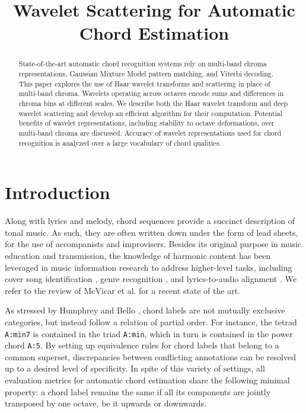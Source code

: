 \documentclass{article}
\title{Wavelet Scattering for Automatic Chord Estimation}
\makeatletter
\newcommand*{\etal}{et al.\@\xspace}
\makeatother
\begin{document}
%
\maketitle
%
\begin{abstract}
State-of-the-art automatic chord recognition systems rely on multi-band chroma representations,
Gaussian Mixture Model pattern matching, and Viterbi decoding.
This paper explores the use of Haar wavelet transforms and scattering in place of multi-band
chroma. Wavelets operating across octaves encode sums and differences in chroma bins at
different scales.
We describe both the Haar wavelet transform and deep wavelet scattering and develop an
efficient algorithm for their computation. Potential benefits of wavelet representations,
including stability to octave deformations, over multi-band chroma are discussed.
Accuracy of wavelet representations used for chord recognition is analyzed over a large
vocabulary of chord qualities.
\end{abstract}

\section{Introduction}\label{sec:introduction}
Along with lyrics and melody, chord sequences provide a succinct description of tonal music.
As such, they are often written down under the form of lead sheets, for the use of
accompanists and improvisers.
Besides its original purpose in music education and transmission, the knowledge of
harmonic content has been leveraged in music information research to address higher-level
tasks, including cover song identification \cite{ellis2007identifying},
genre recognition \cite{perez2009genre}, and lyrics-to-audio alignment
\cite{mauch2012integrating}. We refer to the review of McVicar \etal
\cite{mcvicar2014automatic} for a recent state of the art.

As stressed by Humphrey and Bello \cite{humphrey2015four}, chord labels
are not mutually exclusive categories, but instead follow a relation of partial order.
For instance, the tetrad \texttt{A:min7} is contained in the triad
\texttt{A:min}, which in turn is contained in the power chord \texttt{A:5}.
By setting up equivalence rules for chord labels that belong to a common
superset, discrepancies between conflicting annotations can be resolved
up to a desired level of specificity.
In spite of this variety of settings, all evaluation metrics for automatic
chord estimation share the following minimal property:
a chord label remains the same if all its components are jointly
transposed by one octave, be it upwards or downwards.
\end{document}
